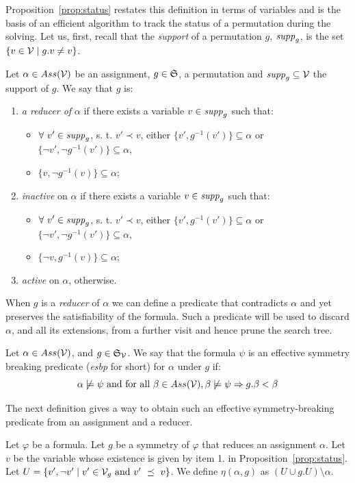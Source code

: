 Proposition~\ref{prop:status} restates this definition in terms of variables
and is the basis of an efficient algorithm to track the status of a
permutation during the solving. Let us, first, recall that the \emph{support}
 of a permutation $g$, $\mathit{supp}_g$, is the set $\{ v \in \mathcal{V} \mid g.v \neq v\}$.
 \clearpage 
\begin{proposition}
 \label{prop:status}
 Let $\alpha \in Ass(\mathcal{V})$ be an assignment, $g \in \mathfrak{S}$, a permutation and $ \mathit{supp}_g \subseteq  \mathcal{V}$ the support of $g$. We say that $g$ is:
 \begin{enumerate}
  \item  \emph{a reducer of} $\alpha$  if there exists a variable $v \in \mathit{supp}_g$
  such that:
  \begin{itemize}
   \item $\forall\ v' \in \mathit{supp}_g$, s. t. $v' \prec v$, either $\{v', g^{-1}(v')\}\subseteq\alpha $ or $\{\neg v', \neg g^{-1}(v')\} \subseteq \alpha $,
   \item $\{v, \neg g^{-1}(v)\} \subseteq \alpha$;
  \end{itemize}
  \item  \emph{inactive} on $\alpha$  if there exists a variable $v \in \mathit{supp}_g$
  such that:
  \begin{itemize}
   \item $\forall\ v' \in \mathit{supp}_g$, s. t. $v' \prec v$, either $\{v', g^{-1}(v')\}\subseteq\alpha $ or $\{\neg v', \neg g^{-1}(v')\} \subseteq \alpha $,
   \item $\{\neg v, g^{-1}(v)\} \subseteq \alpha$;
  \end{itemize}
  \item  \emph{active} on $\alpha$, otherwise.
 \end{enumerate}
\end{proposition}


When $g$ is a \textit{reducer} of $\alpha$ we can define a predicate that contradicts $\alpha$ and yet preserves the satisfiability of the formula. Such a predicate will be used to discard $\alpha$, and all its extensions, from a further visit and hence prune the search tree.
\begin{definition}
 \label{def:esbp}
 Let $\alpha \in Ass(\mathcal{V})$, and $g \in \mathfrak{S}_{\mathcal{V}}$.
 We say that the formula $\psi$ is an effective symmetry breaking predicate (\textit{esbp} for short) for $\alpha$ under $g$ if:
 $$\alpha \not\models \psi \text{ and for all }\beta \in Ass(\mathcal{V}), \beta \not\models \psi \Rightarrow g.\beta < \beta$$
\end{definition}
The next definition gives a way to obtain such an effective symmetry-breaking predicate from an assignment and a reducer.
\begin{definition}\label{def:eta}
 Let $\varphi$ be a formula.
 Let $g$ be a symmetry of $\varphi$ that reduces an assignment $\alpha$.
 Let $v$ be the variable whose existence is given by item 1. in Proposition~\ref{prop:status}.
 Let $U = \{ v', \neg v' \mid v' \in \mathcal{V}_g \text{ and } v'~\preceq~v\}$.
 We define $\eta(\alpha, g)$ as $(U \cup g.U) \setminus \alpha$.
\end{definition}


